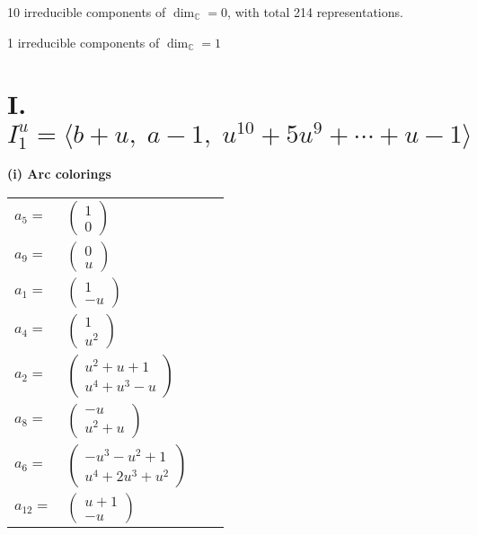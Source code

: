 \documentclass[1p]{elsarticle_modified}
\theoremstyle{definition}
\begin{document}
\raggedright * 10 irreducible components of $\dim_{\mathbb{C}}=0$, with total 214 representations.\\
\raggedright * 1 irreducible components of $\dim_{\mathbb{C}}=1$ \\
\newpage
\renewcommand{\arraystretch}{1}
\centering \section*{I. $I^u_{1}= \langle b+u,\;a-1,\;u^{10}+5 u^9+\cdots+u-1 \rangle$}
\flushleft \textbf{(i) Arc colorings}\\
\begin{tabular}{m{7pt} m{180pt} m{7pt} m{180pt} }
\flushright $a_{5}=$&$\begin{pmatrix}1\\0\end{pmatrix}$ \\
\flushright $a_{9}=$&$\begin{pmatrix}0\\u\end{pmatrix}$ \\
\flushright $a_{1}=$&$\begin{pmatrix}1\\- u\end{pmatrix}$ \\
\flushright $a_{4}=$&$\begin{pmatrix}1\\u^2\end{pmatrix}$ \\
\flushright $a_{2}=$&$\begin{pmatrix}u^2+u+1\\u^4+u^3- u\end{pmatrix}$ \\
\flushright $a_{8}=$&$\begin{pmatrix}- u\\u^2+u\end{pmatrix}$ \\
\flushright $a_{6}=$&$\begin{pmatrix}- u^3- u^2+1\\u^4+2 u^3+u^2\end{pmatrix}$ \\
\flushright $a_{12}=$&$\begin{pmatrix}u+1\\- u\end{pmatrix}$ \\

\end{tabular}
\end{document}
